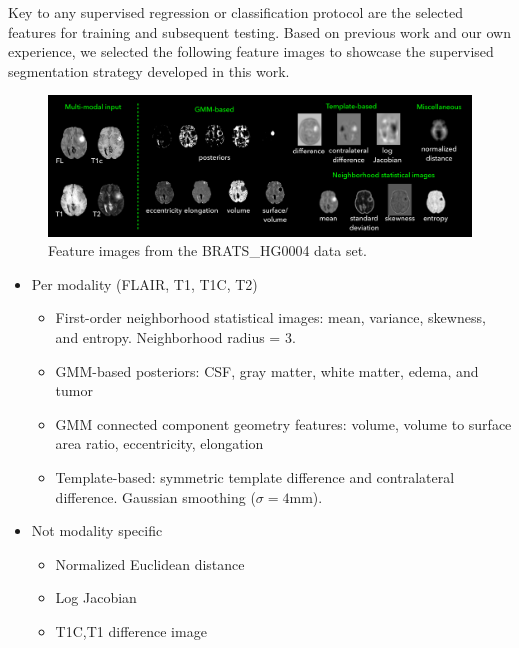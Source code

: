 \documentclass[final,5p,times,twocolumn]{elsarticle}
\begin{document}
Key to any supervised regression or classification protocol are the 
selected features for training and subsequent testing.  Based on previous
work and our own experience, we selected the following feature images
to showcase the supervised segmentation strategy developed in this work.

\begin{figure}
  \centering
  \includegraphics[width=180mm]{Figures/featuresImages.pdf}
  \caption{Feature images from the BRATS\_HG0004 data set.}
\end{figure}

\begin{itemize}
  \item Per modality (FLAIR, T1, T1C, T2)
    \begin{itemize}
      \item First-order neighborhood statistical images:
            mean, variance, skewness, and entropy. 
            Neighborhood radius = 3.
    \item GMM-based posteriors: CSF, gray matter, white matter, edema, and tumor
    \item GMM connected component geometry features:  volume, volume to 
          surface area ratio, eccentricity, elongation
    \item Template-based:  symmetric template difference and contralateral difference.
          Gaussian smoothing ($\sigma = 4$mm).
    \end{itemize}
  \item Not modality specific
    \begin{itemize}
    \item Normalized Euclidean distance
    \item Log Jacobian  
    \item T1C,T1 difference image
    \end{itemize}
\end{itemize}
\end{document}
